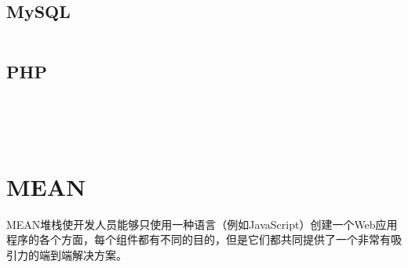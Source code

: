 \begin{lstlisting}[language=bash]

\end{lstlisting}


\section{MySQL}


\begin{lstlisting}[language=bash]

\end{lstlisting}




\section{PHP}


\begin{lstlisting}[language=bash]

\end{lstlisting}



\begin{lstlisting}[language=bash]

\end{lstlisting}



\begin{lstlisting}[language=bash]

\end{lstlisting}




\begin{lstlisting}[language=bash]

\end{lstlisting}



\begin{lstlisting}[language=bash]

\end{lstlisting}






\chapter{MEAN}



MEAN堆栈使开发人员能够只使用一种语言（例如JavaScript）创建一个Web应用程序的各个方面，每个组件都有不同的目的，但是它们都共同提供了一个非常有吸引力的端到端解决方案。


